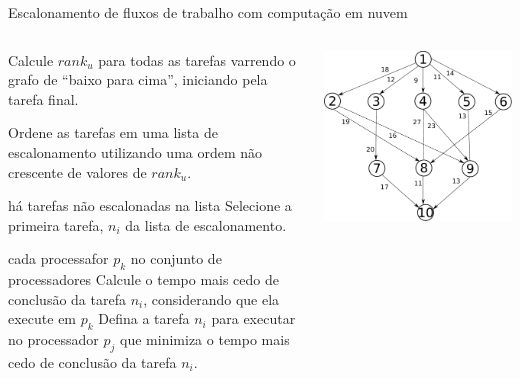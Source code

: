 \documentclass[final]{beamer}
\begin{document}
\begin{frame}[t]
\begin{columns}[t]
\begin{column}{0.60\paperwidth}
\begin{block}{Escalonamento de fluxos de trabalho com computação em nuvem}
\begin{columns}[totalwidth=0.60\paperwidth]
\begin{column}{0.33\paperwidth}
\begin{shaded}
\begin{codebox}
			\li	Calcule $rank_u$ para todas as tarefas varrendo o grafo
			\zi de ``baixo para cima'',	iniciando pela tarefa final.
		
			\li Ordene as tarefas em uma lista de escalonamento utilizando
			\zi uma ordem não crescente de valores de $rank_u$.
		
			\li 	\While há tarefas não escalonadas na lista
			\li 		\Do
							Selecione a primeira tarefa, $n_i$ da lista de escalonamento.

			\li				\For cada processafor $p_k$ no conjunto de processadores
			\li 				\Do
									Calcule o tempo mais cedo de conclusão da tarefa  $n_i$,
			\zi						considerando que ela execute em $p_k$
								\End
			\li				Defina a tarefa $n_i$ para executar no processador $p_j$ que
			\zi					minimiza o tempo mais cedo de conclusão da tarefa $n_i$.
						\End
			\End
			\end{codebox}
			\end{shaded}

		\end{column}
		\begin{column}{0.28\paperwidth}

			\begin{center}
				\includegraphics[width=0.70\columnwidth]{dag_heft.pdf}
			\end{center}	


\end{column}
\end{columns}
\end{block}
\end{column}
\end{columns}
\end{frame}
\end{document}
